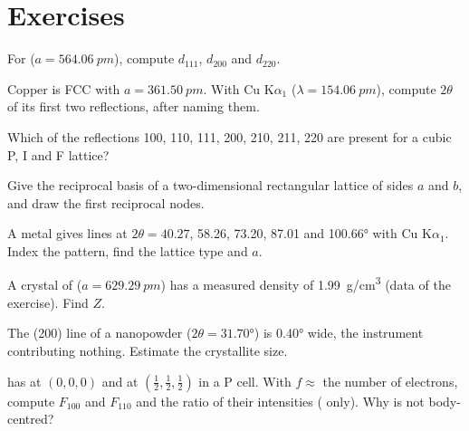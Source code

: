 \section{Exercises}

\begin{exercise}[$\star$]\label{exo:b3:x-ray-diffraction:1}
For  ($a = \qty{564.06}{pm}$), compute $d_{111}$, $d_{200}$ and $d_{220}$.
\end{exercise}

\begin{exercise}[$\star$]\label{exo:b3:x-ray-diffraction:2}
Copper is FCC with $a = \qty{361.50}{pm}$. With Cu K$\alpha_1$ ($\lambda = \qty{154.06}{pm}$),
compute $2\theta$ of its first two reflections, after naming them.
\end{exercise}

\begin{exercise}[$\star$]\label{exo:b3:x-ray-diffraction:3}
Which of the reflections 100, 110, 111, 200, 210, 211, 220 are present for a
cubic P, I and F lattice?
\end{exercise}

\begin{exercise}[$\star$]\label{exo:b3:x-ray-diffraction:4}
Give the reciprocal basis of a two-dimensional rectangular lattice of sides
$a$ and $b$, and draw the first reciprocal nodes.
\end{exercise}

\begin{exercise}[$\star\star$]\label{exo:b3:x-ray-diffraction:5}
A metal gives lines at $2\theta = 40.27$, 58.26, 73.20, 87.01 and \ang{100.66} with Cu
K$\alpha_1$. Index the pattern, find the lattice type and $a$.
\end{exercise}

\begin{exercise}[$\star\star$]\label{exo:b3:x-ray-diffraction:6}
A crystal of  ($a = \qty{629.29}{pm}$) has a measured density of
\qty{1.99}{g/cm^3} (data of the exercise). Find $Z$.
\end{exercise}

\begin{exercise}[$\star\star$]\label{exo:b3:x-ray-diffraction:7}
The (200) line of a  nanopowder ($2\theta = \ang{31.70}$) is \ang{0.40} wide,
the instrument contributing nothing. Estimate the crystallite size.
\end{exercise}

\begin{exercise}[$\star\star$]\label{exo:b3:x-ray-diffraction:8}
 has  at $(0,0,0)$ and  at $(\frac12,\frac12,\frac12)$ in a P cell. With $f
\approx$ the number of electrons, compute $F_{100}$ and $F_{110}$ and the ratio of their
intensities ( only). Why is  not body-centred?
\end{exercise}

